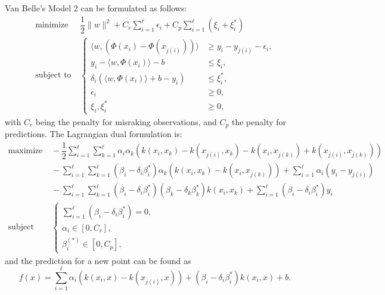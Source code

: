 \documentclass[12pt]{report}
\begin{document}
Van Belle's Model 2 can be formulated as follows:
\begin{equation} \label{model2primal}
\begin{split}
\text{minimize} &\ \dfrac{1}{2}\| w \|^2 + C_{r}\sum_{i=1}^{\ell}\epsilon_{i} + C_{p}\sum_{i=1}^{\ell}(\xi_{i} + \xi_{i}^{*}) \\
\text{subject to} &\ \begin{cases}
\langle w,(\Phi(x_{i}) - \Phi(x_{\overline{j}(i)})) \rangle &\geq y_{i} - y_{\overline{j}(i)} - \epsilon_{i} \text{,}\\
y_{i} - \langle w,\Phi(x_{i}) \rangle - b &\leq \xi_{i} \text{,}\\
\delta_{i}(\langle w,\Phi(x_{i}) \rangle + b - y_{i}) &\leq \xi_{i}^{*} \text{,}\\
\epsilon_{i} &\geq 0 \text{,}\\
\xi_{i}, \xi_{i}^{*} &\geq 0 \text{,}
\end{cases}
\end{split}
\end{equation}
with $C_{r}$ being the penalty for misraking observations, and $C_{p}$ the penalty for predictions.
The Lagrangian dual formulation is:
\begin{equation} \label{model2dual}
\begin{split}
\text{maximize} &\
-\dfrac{1}{2}\sum_{i=1}^{\ell}\sum_{k=1}^{\ell}\alpha_{i}\alpha_{k}(k(x_{i},x_{k})-k(x_{\overline{j}(i)},x_{k})-k(x_{i},x_{\overline{j}(k)})+k(x_{\overline{j}(i)},x_{\overline{j}(k)})) \\
&\ - \sum_{i=1}^{\ell}\sum_{k=1}^{\ell}(\beta_{i} - \delta_{i}\beta_{i}^{*})\alpha_{k}(k(x_{i},x_{k}) - k(x_{i},x_{\overline{j}(k)})) + \sum_{i=1}^{\ell}\alpha_{i}(y_{i} - y_{\overline{j}(i)}) \\
&\ - \sum_{i=1}^{\ell}\sum_{k=1}^{\ell}(\beta_{i} - \delta_{i}\beta_{i}^{*})(\beta_{k} - \delta_{k}\beta_{k}^{*})k(x_{i},x_{k}) + \sum_{i=1}^{\ell}(\beta_{i} - \delta_{i}\beta_{i}^{*})y_{i}\\
\text{subject to} &\ \begin{cases}
\sum_{i=1}^{\ell}(\beta_{i} - \delta_{i}\beta_{i}^{*}) = 0 \text{,}\\
\alpha_{i} \in [0,C_{r}] \text{,}\\
\beta_{i}^{(*)} \in [0,C_{p}] \text{,}
\end{cases}
\end{split}
\end{equation}
and the prediction for a new point can be found as
\begin{equation} \label{model2f}
f(x) = \sum_{i=1}^{\ell}\alpha_{i}(k(x_{i},x) - k(x_{\overline{j}(i)},x))+(\beta_{i}-\delta_{i}\beta_{i}^{*})k(x_{i},x)+b \text{.}
\end{equation}
\end{document}
